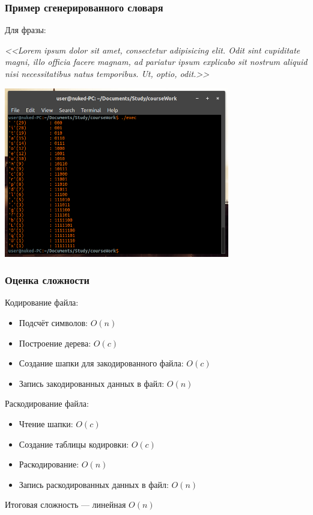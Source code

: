 \documentclass[10pt,pdf,hyperref={unicode}]{beamer}
\begin{document}
	\begin{frame}
		\frametitle{Пример сгенерированного словаря}
		Для фразы:

		\vspace{1em}
		\scriptsize{\textit{<<Lorem ipsum dolor sit amet, consectetur adipisicing elit. 
		Odit sint cupiditate magni, illo officia facere magnam, ad pariatur ipsum explicabo 
		sit nostrum aliquid nisi necessitatibus natus temporibus. Ut, optio, odit.>>}}

		\vspace{1em}
		\centerline{\includegraphics[height=20em]{gen.png}}
	\end{frame}

	\begin{frame}
		\frametitle{Оценка сложности}
		Кодирование файла:\\ 
		\begin{itemize}
			\item Подсчёт символов: $O(n)$
			\item Построение дерева: $O(c)$
			\item Создание шапки для закодированного файла: $O(c)$
			\item Запись закодированных данных в файл: $O(n)$
		\end{itemize}
		Раскодирование файла:\\ 
		\begin{itemize}
			\item Чтение шапки: $O(c)$
			\item Создание таблицы кодировки: $O(c)$
			\item Раскодирование: $O(n)$
			\item Запись раскодированных данных в файл: $O(n)$
		\end{itemize}
		
		Итоговая сложность --- линейная $O(n)$
	\end{frame}
\end{document}
